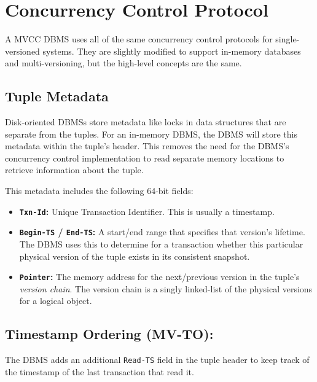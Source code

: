 \documentclass[11pt]{article}
\newcommand{\mvccField}[1]{\texttt{#1}\xspace}
\begin{document}
\section{Concurrency Control Protocol}
A MVCC DBMS uses all of the same concurrency control protocols for single-versioned 
systems. They are slightly modified to support in-memory databases and 
multi-versioning, but the high-level concepts are the same.

\subsection*{Tuple Metadata}
Disk-oriented DBMSs store metadata like locks in data structures that are separate from the 
tuples. For an in-memory DBMS, the DBMS will store this metadata within the tuple's header. This 
removes the need for the DBMS's concurrency control implementation to read separate memory 
locations to retrieve information about the tuple. 

This metadata includes the following 64-bit fields:
\begin{itemize}
    \item \textbf{\mvccField{Txn-Id}:}
    Unique Transaction Identifier. This is usually a timestamp.
    
    \item \textbf{\mvccField{Begin-TS} / \mvccField{End-TS}:}
    A start/end range that specifies that version's lifetime. The DBMS uses this to determine for a 
    transaction whether this particular physical version of the tuple exists in its consistent 
    snapshot.
    
    \item \textbf{\mvccField{Pointer}:}
    The memory address for the next/previous version in the tuple's \textit{version chain}. The 
    version chain is a singly linked-list of the physical versions for a logical object.
\end{itemize}

\subsection*{Timestamp Ordering (MV-TO):}
The DBMS adds an additional \mvccField{Read-TS} field in the tuple header to keep track of the 
timestamp of the last transaction that read it.
    
\end{document}
